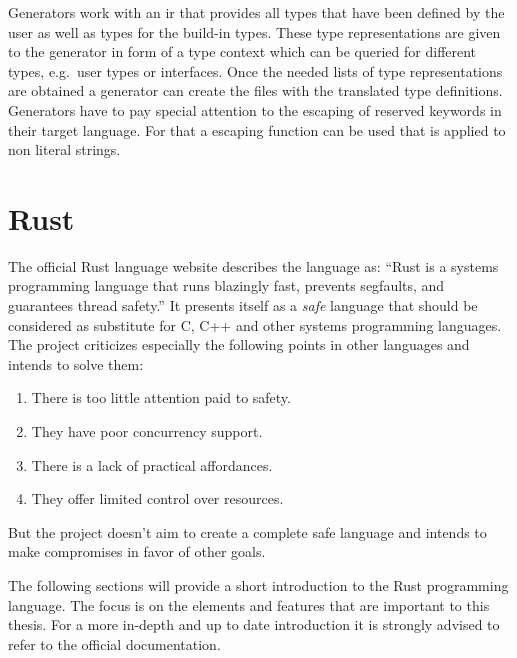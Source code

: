 \documentclass[thesis]{subfiles}
\begin{document}
    Generators work with an \gls{ir} that provides all types that have been defined by the user as well as types for the build-in types.
    These type representations are given to the generator in form of a type context which can be queried for different types, e.g.~user types or interfaces.
    Once the needed lists of type representations are obtained a generator can create the files with the translated type definitions.
    Generators have to pay special attention to the escaping of reserved keywords in their target language.
    For that a escaping function can be used that is applied to non literal strings.

\section{Rust}\label{sec:rust}
  The official Rust language website describes the language as:
  \enquote{Rust is a systems programming language that runs blazingly fast, prevents segfaults, and guarantees thread safety.}\autocite{rust-org}
  It presents itself as a \emph{safe} language that should be considered as substitute for C, C++ and other systems programming languages.
  The project criticizes especially the following points in other languages and intends to solve them\autocite{rust-faq}:
  \begin{enumerate}
    \item There is too little attention paid to safety.
    \item They have poor concurrency support.
    \item There is a lack of practical affordances.
    \item They offer limited control over resources.
  \end{enumerate}
  But the project doesn't aim to create a complete safe language and intends to make compromises in favor of other goals.
  \autocite{rust-faq}

  The following sections will provide a short introduction to the Rust programming language.
  The focus is on the elements and features that are important to this thesis.
  For a more in-depth and up to date introduction it is strongly advised to refer to the official documentation\autocites{rust-org}{rust-doc}{rust-nom}{rust-book}.
\end{document}
